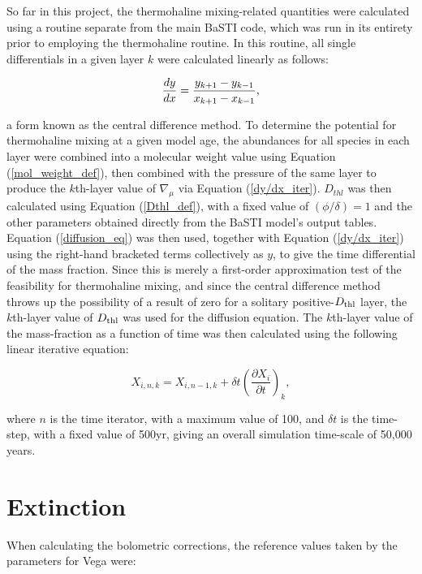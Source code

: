 \documentclass[12pt, a4paper]{report}
\begin{document}
So far in this project, the thermohaline mixing-related quantities were calculated using a routine separate from the main BaSTI code, which was run in its entirety prior to employing the thermohaline routine. In this routine, all single differentials in a given layer $k$ were calculated linearly as follows:

\begin{equation}
\frac{dy}{dx} = \frac{y_{k+1} - y_{k-1}}{x_{k+1} - x_{k-1}} \textnormal{,}
\label{dy/dx_iter}
\end{equation}

a form known as the central difference method.
To determine the potential for thermohaline mixing at a given model age, the abundances for all species in each layer were combined into a molecular weight value using Equation (\ref{mol_weight_def}), then combined with the pressure of the same layer to produce the $k$th-layer value of $\nabla_{\mu}$ via Equation (\ref{dy/dx_iter}). $D_{thl}$ was then calculated using Equation (\ref{Dthl_def}), with a fixed value of $(\phi/\delta) = 1$ and the other parameters obtained directly from the BaSTI model's output tables. Equation (\ref{diffusion_eq}) was then used, together with Equation (\ref{dy/dx_iter}) using the right-hand bracketed terms collectively as $y$, to give the time differential of the mass fraction. Since this is merely a first-order approximation test of the feasibility for thermohaline mixing, and since the central difference method throws up the possibility of a result of zero for a solitary positive-$D_{\textnormal{thl}}$ layer, the $k$th-layer value of $D_{\textnormal{thl}}$ was used for the diffusion equation. The $k$th-layer value of the mass-fraction as a function of time was then calculated using the following linear iterative equation:

\begin{equation}
X_{i,n,k} = X_{i,n-1,k} + \delta t \left( \frac{\partial X_{i}}{\partial t}\right)_{k},
\label{iter_timeind}
\end{equation}

where $n$ is the time iterator, with a maximum value of 100, and $\delta t$ is the time-step, with a fixed value of 500yr, giving an overall simulation time-scale of 50,000 years.

\section{Extinction}
When calculating the bolometric corrections, the reference values taken by the parameters for Vega were:
\end{document}
